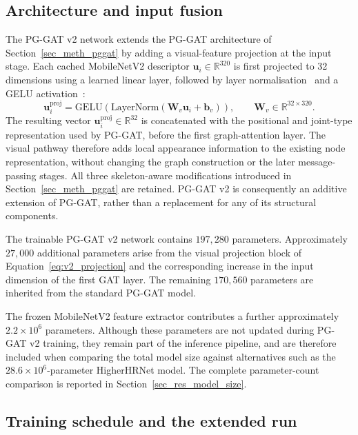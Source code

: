 \subsection{Architecture and input fusion}
\label{sec_meth_v2_arch}

The PG-GAT v2 network extends the PG-GAT architecture of
Section~\ref{sec_meth_pggat} by adding a visual-feature projection at
the input stage.
Each cached MobileNetV2 descriptor
$\mathbf{u}_i \in \mathbb{R}^{320}$ is first projected to 32
dimensions using a learned linear layer,
followed by layer normalisation~\cite{ba2016layernorm}
and a GELU activation~\cite{hendrycks2016gelu}:
\begin{equation}
    \mathbf{u}_i^{\text{proj}}
    =
    \mathrm{GELU}\!\left(
        \mathrm{LayerNorm}
        \left(
            \mathbf{W}_v \mathbf{u}_i + \mathbf{b}_v
        \right)
    \right),
    \qquad
    \mathbf{W}_v \in \mathbb{R}^{32 \times 320}.
    \label{eq:v2_projection}
\end{equation}
The resulting vector
$\mathbf{u}_i^{\text{proj}} \in \mathbb{R}^{32}$ is concatenated with
the positional and joint-type representation used by PG-GAT,
before the first graph-attention layer.
The visual pathway therefore adds local appearance information
to the existing node representation,
without changing the graph construction
or the later message-passing stages.
All three skeleton-aware modifications introduced in
Section~\ref{sec_meth_pggat} are retained.
PG-GAT v2 is consequently an additive extension of PG-GAT,
rather than a replacement for any of its structural components.

The trainable PG-GAT v2 network contains $197{,}280$ parameters.
Approximately $27{,}000$ additional parameters arise from the visual
projection block of Equation~\eqref{eq:v2_projection}
and the corresponding increase in the input dimension
of the first GAT layer.
The remaining $170{,}560$ parameters are inherited from the standard
PG-GAT model.

The frozen MobileNetV2 feature extractor contributes a further
approximately $2.2\times10^{6}$ parameters.
Although these parameters are not updated during PG-GAT v2 training,
they remain part of the inference pipeline,
and are therefore included when comparing the total model size
against alternatives such as the
$28.6\times10^{6}$-parameter HigherHRNet model.
The complete parameter-count comparison is reported in
Section~\ref{sec_res_model_size}.

\subsection{Training schedule and the extended run}
\label{sec_meth_v2_training}

